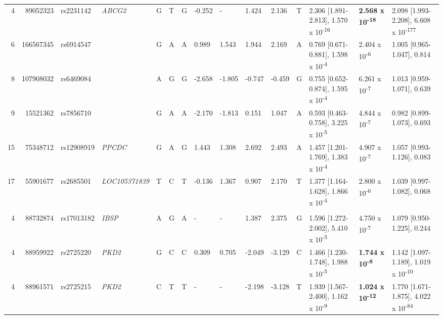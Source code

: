 \documentclass[twoside,openright]{report}
\begin{document}
\begin{landscape}
\begin{table}
{\begin{tabular}[t]{rrlllllllllllll}
\hspace{1em}4 & 89052323 & rs2231142 & \em{ABCG2} & G & T & G & -0.252 & - & 1.424 & 2.136 & T & 2.306 [1.891-2.813], 1.570 x 10\textsuperscript{-16} & \textbf{2.568 x 10\textsuperscript{-18}} & 2.098 [1.993-2.208], 6.608 x 10\textsuperscript{-177}\\
\hspace{1em}6 & 166567345 & rs6914547 & \em{} & G & A & A & 0.989 & 1.543 & 1.944 & 2.169 & A & 0.769 [0.671-0.881], 1.598 x 10\textsuperscript{-4} & 2.404 x 10\textsuperscript{-6} & 1.005 [0.965-1.047], 0.814\\
\hspace{1em}8 & 107908032 & rs6469084 & \em{} & A & G & G & -2.658 & -1.805 & -0.747 & -0.459 & G & 0.755 [0.652-0.874], 1.595 x 10\textsuperscript{-4} & 6.261 x 10\textsuperscript{-7} & 1.013 [0.959-1.071], 0.639\\
\hspace{1em}9 & 15521362 & rs7856710 & \em{} & G & A & A & -2.170 & -1.813 & 0.151 & 1.047 & A & 0.593 [0.463-0.758], 3.225 x 10\textsuperscript{-5} & 4.844 x 10\textsuperscript{-7} & 0.982 [0.899-1.073], 0.693\\
\hspace{1em}15 & 75348712 & rs12908919 & \em{PPCDC} & G & A & G & 1.443 & 1.308 & 2.692 & 2.493 & A & 1.457 [1.201-1.769], 1.383 x 10\textsuperscript{-4} & 4.907 x 10\textsuperscript{-7} & 1.057 [0.993-1.126], 0.083\\
\hspace{1em}17 & 55901677 & rs2685501 & \em{LOC105371839} & T & C & T & -0.136 & 1.367 & 0.907 & 2.170 & T & 1.377 [1.164-1.628], 1.866 x 10\textsuperscript{-4} & 2.800 x 10\textsuperscript{-6} & 1.039 [0.997-1.082], 0.068\\
\addlinespace[0.3em]
\multicolumn{15}{l}{\textbf{nSL}}\\
\hspace{1em}4 & 88732874 & rs17013182 & \em{IBSP} & A & G & A & - & - & 1.387 & 2.375 & G & 1.596 [1.272-2.002], 5.410 x 10\textsuperscript{-5} & 4.750 x 10\textsuperscript{-7} & 1.079 [0.950-1.225], 0.244\\
\hspace{1em}4 & 88959922 & rs2725220 & \em{PKD2} & G & C & C & 0.309 & 0.705 & -2.049 & -3.129 & C & 1.466 [1.230-1.748], 1.988 x 10\textsuperscript{-5} & \textbf{1.744 x 10\textsuperscript{-8}} & 1.142 [1.097-1.189], 1.019 x 10\textsuperscript{-10}\\
\hspace{1em}4 & 88961571 & rs2725215 & \em{PKD2} & C & T & T & - & - & -2.198 & -3.128 & T & 1.939 [1.567-2.400], 1.162 x 10\textsuperscript{-9} & \textbf{1.024 x 10\textsuperscript{-12}} & 1.770 [1.671-1.875], 4.022 x 10\textsuperscript{-84}\\

\end{tabular}}
\end{table}
\end{landscape}
\end{document}
